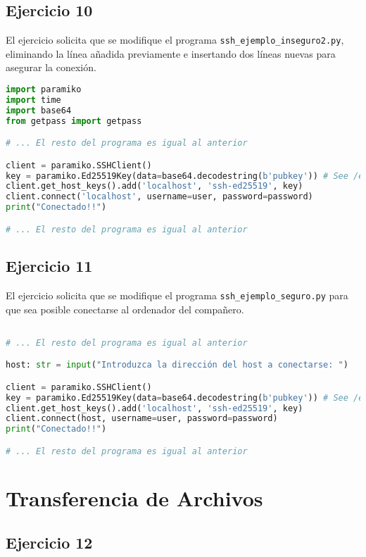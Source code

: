 \subsection{Ejercicio 10}

El ejercicio solicita que se modifique el programa \lstinline{ssh_ejemplo_inseguro2.py},
eliminando la línea añadida previamente e insertando dos líneas nuevas para asegurar la conexión.

\begin{lstlisting}[language=Python]
import paramiko
import time
import base64
from getpass import getpass

# ... El resto del programa es igual al anterior

client = paramiko.SSHClient()
key = paramiko.Ed25519Key(data=base64.decodestring(b'pubkey')) # See /etc/ssh/
client.get_host_keys().add('localhost', 'ssh-ed25519', key)
client.connect('localhost', username=user, password=password)
print("Conectado!!")

# ... El resto del programa es igual al anterior
\end{lstlisting}

\subsection{Ejercicio 11}

El ejercicio solicita que se modifique el programa \lstinline{ssh_ejemplo_seguro.py}
para que sea posible conectarse al ordenador del compañero.

\begin{lstlisting}[language=Python]

# ... El resto del programa es igual al anterior

host: str = input("Introduzca la dirección del host a conectarse: ")

client = paramiko.SSHClient()
key = paramiko.Ed25519Key(data=base64.decodestring(b'pubkey')) # See /etc/ssh/
client.get_host_keys().add('localhost', 'ssh-ed25519', key)
client.connect(host, username=user, password=password)
print("Conectado!!")

# ... El resto del programa es igual al anterior
\end{lstlisting}

\section{Transferencia de Archivos}

\subsection{Ejercicio 12}
